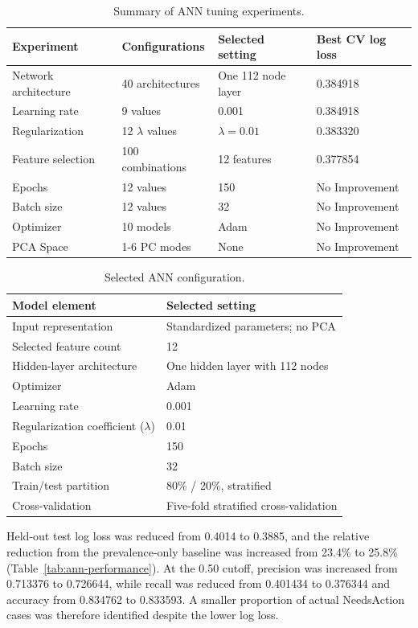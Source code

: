 \documentclass[NewProceedings,letterpaper,NoPageNumbers,NoLineNumbers, DoubleSpace]{ascelike-new}
\begin{document}
\begin{table}[htbp]
\centering
\caption{Summary of ANN tuning experiments.}
\label{tab:ann-tuning}
\begin{tabular}{llll}
\hline
\textbf{Experiment} & \textbf{Configurations} & \textbf{Selected setting} & \textbf{Best CV log loss} \\
\hline
Network architecture & 40 architectures & One 112 node layer & 0.384918 \\
Learning rate & 9 values & 0.001 & 0.384918 \\
Regularization & 12 $\lambda$ values & $\lambda = 0.01$ & 0.383320 \\
Feature selection & 100 combinations & 12 features & 0.377854 \\
Epochs & 12 values & 150 & No Improvement \\
Batch size & 12 values & 32 & No Improvement \\
Optimizer & 10 models & Adam & No Improvement \\
PCA Space & 1-6 PC modes & None & No Improvement \\
\hline
\end{tabular}
\end{table}

\begin{table}[htbp]
\centering
\caption{Selected ANN configuration.}
\label{tab:ann-configuration}
\begin{tabular}{ll}
\hline
\textbf{Model element} & \textbf{Selected setting} \\
\hline
Input representation & Standardized parameters; no PCA \\
Selected feature count & 12 \\
Hidden-layer architecture & One hidden layer with 112 nodes \\
Optimizer & Adam \\
Learning rate & 0.001 \\
Regularization coefficient ($\lambda$) & 0.01 \\
Epochs & 150 \\
Batch size & 32 \\
Train/test partition & 80\% / 20\%, stratified \\
Cross-validation & Five-fold stratified cross-validation \\
\hline
\end{tabular}
\end{table}

Held-out test log loss was reduced from 0.4014 to 0.3885, and the relative reduction from the prevalence-only baseline was increased from 23.4\% to 25.8\% (Table~\ref{tab:ann-performance}). At the 0.50 cutoff, precision was increased from 0.713376 to 0.726644, while recall was reduced from 0.401434 to 0.376344 and accuracy from 0.834762 to 0.833593. A smaller proportion of actual NeedsAction cases was therefore identified despite the lower log loss.
\end{document}
